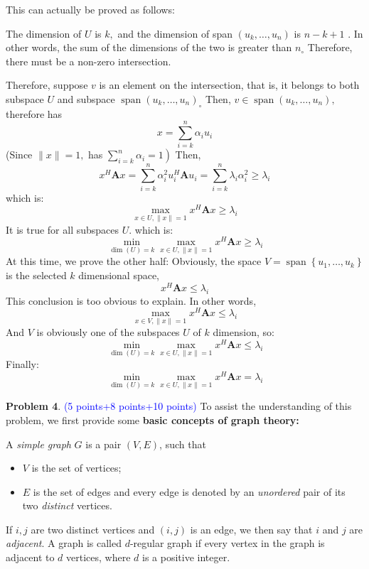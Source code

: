 \documentclass[english,onecolumn]{IEEEtran}
\begin{document}
This can actually be proved as follows: 

The dimension of $U$ is $k,$ and the dimension of span $\left(u_{k}, \ldots, u_{n}\right)$ is $n-k+1$ . In other words, the sum of the dimensions of the two is greater than $n_{\circ}$ Therefore, there must be a non-zero intersection. 

Therefore, suppose $v$ is an element on the intersection, that is, it belongs to both subspace $U$ and subspace $\operatorname{span}\left(u_{k}, \ldots, u_{n}\right) _{\circ}$ Then, $v \in \operatorname{span}\left(u_{k}, \ldots, u_{n}\right),$ therefore has
$$
x=\sum_{i=k}^{n} \alpha_{i} u_{i}
$$
(Since $\|x\|=1,$ has $\left.\sum_{i=k}^{n} \alpha_{i}=1\right)$
Then,
$$
x^{H} \mathbf{A} x=\sum_{i=k}^{n} \alpha_{i}^{2} u_{i}^{H} \mathbf{A} u_{i}= \sum_{i=k}^{n} \lambda_{i} \alpha_{i}^{2} \geq \lambda_{i}
$$
which is:
$$
\max _{x \in U,\|x\|=1} x^{H} \mathbf{A} x \geq \lambda_{i}
$$
It is true for all subspaces $U$. which is:
$$
\min _{\operatorname{dim}(U)=k} \max _{x \in U,\|x\|=1} x^{H} \mathbf{A} x \geq \lambda_{i}
$$
At this time, we prove the other half:
Obviously, the space $V=\operatorname{span}\left\{u_{1}, \ldots, u_{k}\right\}$ is the selected $k$ dimensional space,
$$
x^{H} \mathbf{A} x \leq \lambda_{i}
$$
This conclusion is too obvious to explain. In other words,
$$
\max _{x \in V,\|x\|=1} x^{H} \mathbf{A} x \leq \lambda_{i}
$$
And $V$ is obviously one of the subspaces $U$ of $k$ dimension, so:
$$
\min _{\operatorname{dim}(U)=k} \max _{x \in U,\|x\|=1} x^{H} \mathbf{A} x \leq \lambda_{i}
$$
Finally:
$$
\min _{\operatorname{dim}(U)=k} \max _{x \in U,\|x\|=1} x^{H} \mathbf{A} x=\lambda_{i}
$$



\newpage
\noindent\textbf{Problem 4}. \textcolor{blue}{(5 points+8 points+10 points)}
\noindent To assist the understanding of this problem, we first provide some \textbf{basic concepts of graph theory:}
 
 A \textit{simple graph} $G$ is a pair $(V,E)$, such that
\begin{itemize}
	\item 
	$V$ is the set of vertices;
	
	\item 
	$E$ is the set of edges and every edge is denoted by an \textit{unordered} pair of its two \textit{distinct} vertices.
\end{itemize}


 If $i,j$ are two distinct vertices and $(i,j)$ is an edge, we then say that $i$ and $j$ are \textit{adjacent}. A graph is called $d$-regular graph if every vertex in the graph is adjacent to $d$ vertices, where $d$ is a positive integer.
\end{document}
